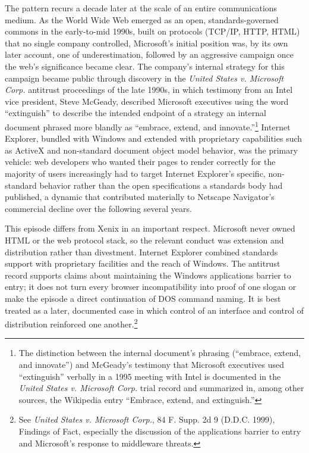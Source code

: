 \documentclass[11pt]{book}
\begin{document}
The pattern recurs a decade later at the scale of an entire communications medium. As the World Wide Web emerged as an open, standards-governed commons in the early-to-mid 1990s, built on protocols (TCP/IP, HTTP, HTML) that no single company controlled, Microsoft's initial position was, by its own later account, one of underestimation, followed by an aggressive campaign once the web's significance became clear. The company's internal strategy for this campaign became public through discovery in the \emph{United States v. Microsoft Corp.} antitrust proceedings of the late 1990s, in which testimony from an Intel vice president, Steve McGeady, described Microsoft executives using the word \enquote{extinguish} to describe the intended endpoint of a strategy an internal document phrased more blandly as \enquote{embrace, extend, and innovate.}\footnote{The distinction between the internal document's phrasing (\enquote{embrace, extend, and innovate}) and McGeady's testimony that Microsoft executives used \enquote{extinguish} verbally in a 1995 meeting with Intel is documented in the \emph{United States v. Microsoft Corp.} trial record and summarized in, among other sources, the Wikipedia entry \enquote{Embrace, extend, and extinguish.}} Internet Explorer, bundled with Windows and extended with proprietary capabilities such as ActiveX and non-standard document object model behavior, was the primary vehicle: web developers who wanted their pages to render correctly for the majority of users increasingly had to target Internet Explorer's specific, non-standard behavior rather than the open specifications a standards body had published, a dynamic that contributed materially to Netscape Navigator's commercial decline over the following several years.

This episode differs from Xenix in an important respect. Microsoft never owned HTML or the web protocol stack, so the relevant conduct was extension and distribution rather than divestment. Internet Explorer combined standards support with proprietary facilities and the reach of Windows. The antitrust record supports claims about maintaining the Windows applications barrier to entry; it does not turn every browser incompatibility into proof of one slogan or make the episode a direct continuation of DOS command naming. It is best treated as a later, documented case in which control of an interface and control of distribution reinforced one another.\footnote{See \emph{United States v. Microsoft Corp.}, 84 F. Supp. 2d 9 (D.D.C. 1999), Findings of Fact, especially the discussion of the applications barrier to entry and Microsoft's response to middleware threats.}
\end{document}
